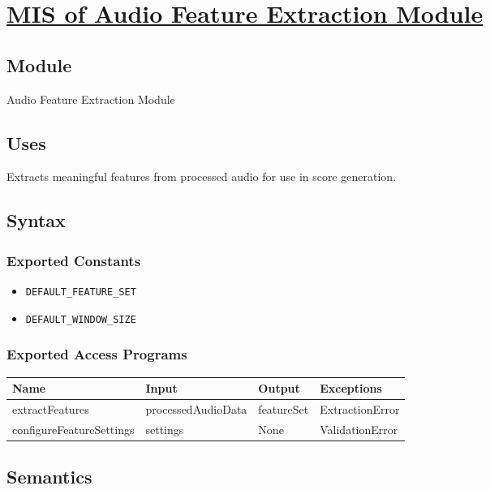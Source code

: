 \documentclass[12pt, titlepage]{article}
\begin{document}
\section{\hyperref[mAFE]{MIS of Audio Feature Extraction Module}} \label{M5}  

\subsection{Module}  
Audio Feature Extraction Module  

\subsection{Uses}  
Extracts meaningful features from processed audio for use in score generation.  

\subsection{Syntax}  

\subsubsection{Exported Constants}  
\begin{itemize}
    \item \texttt{DEFAULT\_FEATURE\_SET}  
    \item \texttt{DEFAULT\_WINDOW\_SIZE}  
\end{itemize}  

\subsubsection{Exported Access Programs}  
\begin{center}  
\begin{tabular}{|p{4.5cm}|p{4cm}|p{2.5cm}|p{3.5cm}|}  
\hline  
\textbf{Name} & \textbf{Input} & \textbf{Output} & \textbf{Exceptions} \\  
\hline  
extractFeatures & processedAudioData & featureSet & ExtractionError \\  
configureFeatureSettings & settings & None & ValidationError \\  
\hline  
\end{tabular}  
\end{center}  

\subsection{Semantics}  
\end{document}
